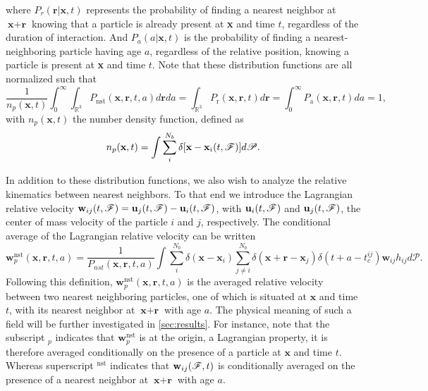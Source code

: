 where $P_r(\textbf{r}|\textbf{x},t)$ represents the probability of finding a nearest neighbor at $\textbf{x}+\textbf{r}$ knowing that a particle is already present at \textbf{x} and time $t$, regardless of the duration of interaction. 
And $P_a(a|\textbf{x},t)$ is the probability of finding a nearest-neighboring particle having age $a$, regardless of the relative position, knowing a particle is present at \textbf{x} and time $t$. 
Note that these distribution functions are all normalized such that 
\begin{equation}
    \frac{1}{n_p(\textbf{x},t)}\int_0^\infty \int_{\mathbb{R}^3} P_\text{nst}(\textbf{x},\textbf{r},t,a) d\textbf{r} da 
    = 
    \int_{\mathbb{R}^3} P_\text{r}(\textbf{x},\textbf{r},t) d\textbf{r} 
    = \int_0^\infty P_\text{a}(\textbf{x},\textbf{r},t) da 
    = 1,
    \label{eq:norm}
\end{equation}
with $n_p(\textbf{x},t)$ the number density function, defined as
\begin{equation}
    n_p(\textbf{x},t)= 
    \int \sum_{i}^{N_b}\delta[\textbf{x}-\textbf{x}_i(t,\FF)] d\mathscr{P}.
    \label{eq:n_p}
\end{equation}


In addition to these distribution functions, we also wish to analyze the relative kinematics   between nearest neighbors. 
To that end we introduce the Lagrangian relative velocity $\textbf{w}_{ij}(t,\mathscr{F}) = \textbf{u}_j(t,\mathscr{F}) - \textbf{u}_i(t,\mathscr{F})$, with $\textbf{u}_i(t,\mathscr{F})$ and $\textbf{u}_j(t,\mathscr{F})$, the center of mass velocity of the particle $i$ and $j$, respectively.
The conditional average of the Lagrangian relative velocity can be written
\begin{equation*}
    \textbf{w}^\text{nst}_p (\textbf{x},\textbf{r},t,a)
    = 
    \frac{1}{P_{nst}(\textbf{x},\textbf{r},t,a)}
    \int \sum_{i}^{N_b}\delta(\textbf{x}-\textbf{x}_i)
    \sum_{j\neq i}^{N_b}\delta(\textbf{x}+\textbf{r}-\textbf{x}_j) 
    \delta(t+a-t_c^{ij}) 
    \textbf{w}_{ij}
    h_{ij} 
    d\mathscr{P}.
    \label{eq:q_nstij}
\end{equation*}
Following this definition, $\textbf{w}^\text{nst}_p(\textbf{x},\textbf{r},t,a)$ is the averaged relative velocity between two nearest neighboring particles, one of which is situated at $\textbf{x}$ and time $t$, with its nearest neighbor at $\textbf{x}+\textbf{r}$ with age $a$. 
The physical meaning of such a field will be further investigated in \ref{sec:results}. 
For instance, note that the subscript $_p$ indicates that $\textbf{w}^\text{nst}_p$ is at the origin, a Lagrangian property, it is therefore averaged conditionally on the presence of a particle at $\textbf{x}$ and time $t$. 
Whereas superscript $^\text{nst}$ indicates that $\textbf{w}_{ij}(\mathscr{F},t)$ is conditionally averaged on the presence of a nearest neighbor at $\textbf{x}+\textbf{r}$ with age $a$. 

